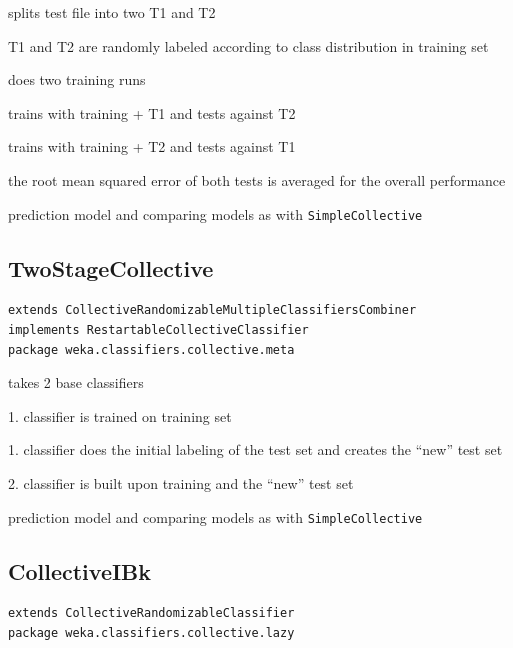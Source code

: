 \documentclass[a4paper]{book}
\begin{document}
\begin{tight_itemize}
	\item splits test file into two T1 and T2
	\item T1 and T2 are randomly labeled according to class distribution in training set
	\item does two training runs
	\begin{tight_itemize}
		\item trains with training + T1 and tests against T2
		\item trains with training + T2 and tests against T1
	\end{tight_itemize}
	\item the root mean squared error of both tests is averaged for the overall performance
	\item prediction model and comparing models as with \texttt{SimpleCollective}
\end{tight_itemize}


\subsection{TwoStageCollective}
\begin{verbatim}
extends CollectiveRandomizableMultipleClassifiersCombiner
implements RestartableCollectiveClassifier
package weka.classifiers.collective.meta
\end{verbatim}

\begin{tight_itemize}
	\item takes 2 base classifiers
	\item 1. classifier is trained on training set 
	\item 1. classifier does the initial labeling of the test set and creates the ``new'' test set
	\item 2. classifier is built upon training and the ``new'' test set
	\item prediction model and comparing models as with \texttt{SimpleCollective}
\end{tight_itemize}

\subsection{CollectiveIBk}
\begin{verbatim}
extends CollectiveRandomizableClassifier
package weka.classifiers.collective.lazy
\end{verbatim}
\end{document}
